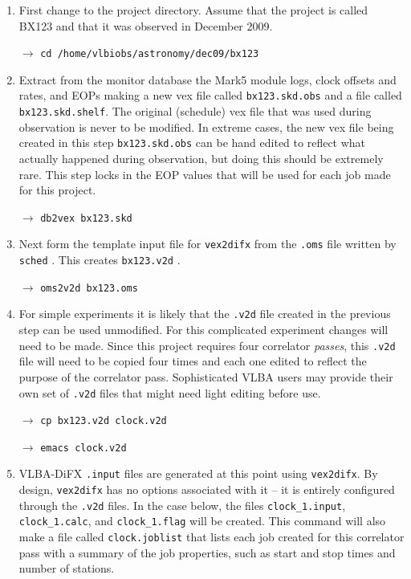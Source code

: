 \begin{enumerate}

\item
First change to the project directory.
Assume that the project is called BX123 and that it was observed in December 2009.

$\longrightarrow$ {\tt cd /home/vlbiobs/astronomy/dec09/bx123}

\item
Extract from the monitor database the Mark5 module logs, clock offsets and rates, and EOPs making a new vex file called {\tt bx123.skd.obs} and a file called {\tt bx123.skd.shelf}.
The original (schedule) vex file that was used during observation is never to be modified.  
In extreme cases, the new vex file being created in this step {\tt bx123.skd.obs} can be hand edited to reflect what actually happened during observation, but doing this should be extremely rare. 
This step locks in the EOP values that will be used for each job made for this project.

$\longrightarrow$ {\tt db2vex bx123.skd}

\item
Next form the template input file for {\tt vex2difx} from the {\tt .oms} file written by {\tt sched} .
This creates {\tt bx123.v2d} .

$\longrightarrow$ {\tt oms2v2d bx123.oms}

\item
For simple experiments it is likely that the {\tt .v2d} file  created in the previous step can be used unmodified.
For this complicated experiment changes will need to be made.
Since this project requires four correlator {\em passes}, this {\tt .v2d} file will need to be copied four times and each one edited to reflect the purpose of the correlator pass.
Sophisticated VLBA users may provide their own set of {\tt .v2d} files that might need light editing before use.

$\longrightarrow$ {\tt cp bx123.v2d clock.v2d}

$\longrightarrow$ {\tt emacs clock.v2d}

\item
VLBA-DiFX {\tt .input} files are generated at this point using {\tt vex2difx}.
By design, {\tt vex2difx} has no options associated with it -- it is entirely configured through the {\tt .v2d} files.
In the case below, the files {\tt clock\_1.input}, {\tt clock\_1.calc}, and {\tt clock\_1.flag} will be created.
This command will also make a file called {\tt clock.joblist} that lists each job created for this correlator pass with a summary of the job properties, such as start and stop times and number of stations.


\end{enumerate}
